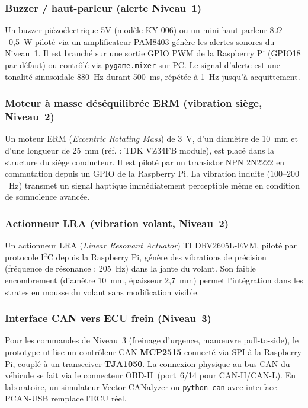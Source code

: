 \documentclass[12pt,a4paper]{report}
\begin{document}
\subsubsection{Buzzer / haut-parleur (alerte Niveau~1)}

Un buzzer pi\'ezo\'electrique 5V (mod\`ele KY-006) ou un mini-haut-parleur 8\,$\Omega$~0,5~W pilot\'e via un amplificateur PAM8403 g\'en\`ere les alertes sonores du Niveau~1. Il est branch\'e sur une sortie GPIO PWM de la Raspberry Pi (GPIO18 par d\'efaut) ou contr\^ol\'e via \texttt{pygame.mixer} sur PC. Le signal d'alerte est une tonalit\'e sinuso\"idale 880~Hz durant 500~ms, r\'ep\'et\'ee \`a 1~Hz jusqu'\`a acquittement.

\subsubsection{Moteur \`a masse d\'es\'equilibr\'ee ERM (vibration si\`ege, Niveau~2)}

Un moteur ERM (\textit{Eccentric Rotating Mass}) de 3~V, d'un diam\`etre de 10~mm et d'une longueur de 25~mm (r\'ef. : TDK VZ34FB module), est plac\'e dans la structure du si\`ege conducteur. Il est pilot\'e par un transistor NPN 2N2222 en commutation depuis un GPIO de la Raspberry Pi. La vibration induite ($100$--$200$~Hz) transmet un signal haptique imm\'ediatement perceptible m\^eme en condition de somnolence avanc\'ee.

\subsubsection{Actionneur LRA (vibration volant, Niveau~2)}

Un actionneur LRA (\textit{Linear Resonant Actuator}) TI DRV2605L-EVM, pilot\'e par protocole I$^2$C depuis la Raspberry Pi, g\'en\`ere des vibrations de pr\'ecision (fr\'equence de r\'esonance : 205~Hz) dans la jante du volant. Son faible encombrement (diam\`etre 10~mm, \'epaisseur 2,7~mm) permet l'int\'egration dans les strates en mousse du volant sans modification visible.

\subsubsection{Interface CAN vers ECU frein (Niveau~3)}

Pour les commandes de Niveau~3 (freinage d'urgence, man\oe uvre pull-to-side), le prototype utilise un contr\^oleur CAN \textbf{MCP2515} connect\'e via SPI \`a la Raspberry Pi, coupl\'e \`a un transceiver \textbf{TJA1050}. La connexion physique au bus CAN du v\'ehicule se fait via le connecteur OBD-II~(port~6/14 pour CAN-H/CAN-L). En laboratoire, un simulateur Vector CANalyzer ou \texttt{python-can} avec interface PCAN-USB remplace l'ECU r\'eel.
\end{document}
